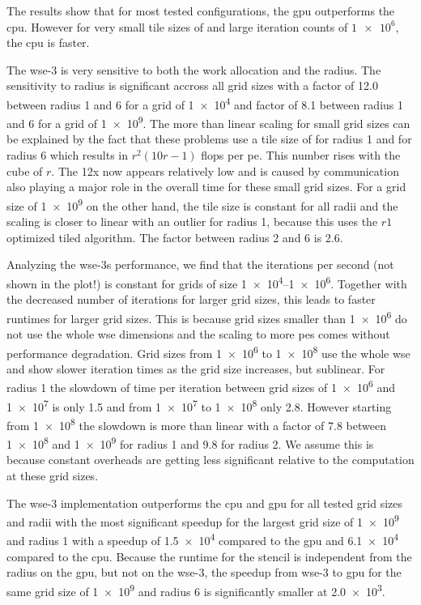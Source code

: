 The results show that for most tested configurations, the \ac{gpu} outperforms the \ac{cpu}.
However for very small tile sizes of  and large iteration counts of $\num{1e6}$, the \ac{cpu} is faster.

The \ac{wse}-3 is very sensitive to both the work allocation and the radius. The sensitivity to radius is significant accross all grid sizes with a factor of \num{12.0} between radius \num{1} and \num{6} for a grid of \num{1e4} and factor of \num{8.1} between radius \num{1} and \num{6} for a grid of \num{1e9}.
The more than linear scaling for small grid sizes can be explained by the fact that these problems use a tile size of  for radius \num{1} and  for radius \num{6} which results in $r^2(10r-1)$ flops per \ac{pe}. This number rises with the cube of $r$. The 12x now appears relatively low and is caused by communication also playing a major role in the overall time for these small grid sizes. For a grid size of \num{1e9} on the other hand, the tile size is constant for all radii and the scaling is closer to linear with an outlier for radius \num{1}, because this uses the $r1$ optimized tiled algorithm. The factor between radius \num{2} and \num{6} is \num{2.6}.

Analyzing the \ac{wse}-3s performance, we find that the iterations per second (not shown in the plot!) is constant for grids of size \numrange{1e4}{1e6}. Together with the decreased number of iterations for larger grid sizes, this leads to faster runtimes for larger grid sizes. This is because grid sizes smaller than \num{1e6} do not use the whole \ac{wse} dimensions and the scaling to more \acp{pe} comes without performance degradation. Grid sizes from \num{1e6} to \num{1e8} use the whole \ac{wse} and show slower iteration times as the grid size increases, but sublinear. For radius \num{1} the slowdown of time per iteration between grid sizes of \num{1e6} and \num{1e7} is only \num{1.5} and from \num{1e7} to \num{1e8} only \num{2.8}. However starting from \num{1e8} the slowdown is more than linear with a factor of \num{7.8} between \num{1e8} and \num{1e9} for radius \num{1} and \num{9.8} for radius \num{2}. We assume this is because constant overheads are getting less significant relative to the computation at these grid sizes.

The \ac{wse}-3 implementation outperforms the \ac{cpu} and \ac{gpu} for all tested grid sizes and radii with the most significant speedup for the largest grid size of \num{1e9} and radius \num{1} with a speedup of \num{1.5e4} compared to the \ac{gpu} and \num{6.1e4} compared to the \ac{cpu}. Because the runtime for the stencil is independent from the radius on the \ac{gpu}, but not on the \ac{wse}-3, the speedup from \ac{wse}-3 to \ac{gpu} for the same grid size of \num{1e9} and radius \num{6} is significantly smaller at \num{2.0e3}.


